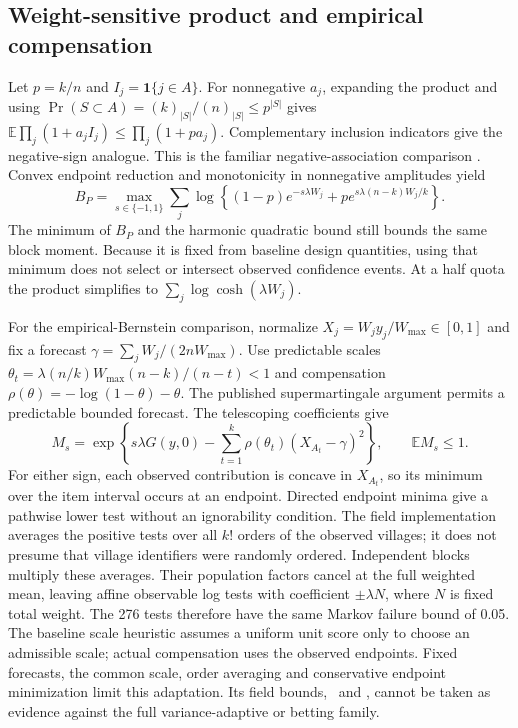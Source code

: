 \documentclass[11pt]{article}
\newcommand{\E}{\mathbb{E}}
\newcommand{\ind}{\mathbf{1}}
\begin{document}
\subsection{Weight-sensitive product and empirical compensation}
Let $p=k/n$ and $I_j=\ind\{j\in A\}$. For nonnegative $a_j$, expanding the product and using $\Pr(S\subset A)=(k)_{|S|}/(n)_{|S|}\leq p^{|S|}$ gives $\E\prod_j(1+a_jI_j)\leq\prod_j(1+pa_j)$. Complementary inclusion indicators give the negative-sign analogue. This is the familiar negative-association comparison \citep{joagdev1983}. Convex endpoint reduction and monotonicity in nonnegative amplitudes yield
\[
 B_P=\max_{s\in\{-1,1\}}\sum_j\log\left\{(1-p)e^{-s\lambda W_j}+pe^{s\lambda(n-k)W_j/k}\right\}.
\]
The minimum of $B_P$ and the harmonic quadratic bound still bounds the same block moment. Because it is fixed from baseline design quantities, using that minimum does not select or intersect observed confidence events. At a half quota the product simplifies to $\sum_j\log\cosh(\lambda W_j)$.

For the empirical-Bernstein comparison, normalize $X_j=W_jy_j/W_{\max}\in[0,1]$ and fix a forecast $\gamma=\sum_jW_j/(2nW_{\max})$. Use predictable scales $\theta_t=\lambda(n/k)W_{\max}(n-k)/(n-t)<1$ and compensation $\rho(\theta)=-\log(1-\theta)-\theta$. The published supermartingale argument \citep{waudby2020} permits a predictable bounded forecast. The telescoping coefficients give
\[
 M_s=\exp\left\{s\lambda G(y,0)-\sum_{t=1}^k\rho(\theta_t)(X_{A_t}-\gamma)^2\right\},\qquad \E M_s\leq1.
\]
For either sign, each observed contribution is concave in $X_{A_t}$, so its minimum over the item interval occurs at an endpoint. Directed endpoint minima give a pathwise lower test without an ignorability condition. The field implementation averages the positive tests over all $k!$ orders of the observed villages; it does not presume that village identifiers were randomly ordered. Independent blocks multiply these averages. Their population factors cancel at the full weighted mean, leaving affine observable log tests with coefficient $\pm\lambda N$, where $N$ is fixed total weight. The 276 tests therefore have the same Markov failure bound of 0.05. The baseline scale heuristic assumes a uniform unit score only to choose an admissible scale; actual compensation uses the observed endpoints. Fixed forecasts, the common scale, order averaging and conservative endpoint minimization limit this adaptation. Its field bounds, \EmpBernMeanCertificate\ and \EmpBernShortfallCertificate, cannot be taken as evidence against the full variance-adaptive or betting family.
\end{document}
